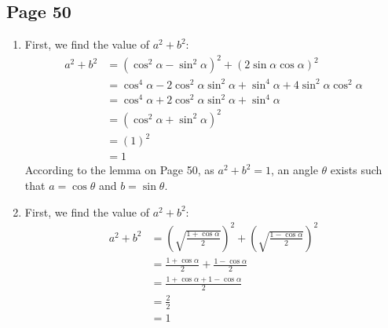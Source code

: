 \documentclass{article}
\newenvironment{solutions}[1]
{\subsection*{#1}
 \begin{enumerate}[leftmargin=1.5em]}
{\end{enumerate}}
\newcommand{\solution}{\item}
\begin{document}
\begin{solutions}{Page 50}

\solution %
First, we find the value of $a^2 + b^2$:
\begin{align*}
a^2 + b^2 &= (\cos^{2}{\alpha} - \sin^{2}{\alpha})^2 + (2\sin{\alpha}\cos{\alpha})^2 \\
&= \cos^{4}{\alpha} - 2\cos^{2}{\alpha}\sin^{2}{\alpha} + \sin^{4}{\alpha} + 4\sin^{2}{\alpha}\cos^{2}{\alpha} \\
&= \cos^{4}{\alpha} + 2\cos^{2}{\alpha}\sin^{2}{\alpha} + \sin^{4}{\alpha} \\
&= (\cos^{2}{\alpha} + \sin^{2}{\alpha})^2 \\
&= (1)^2 \\
&= 1
\end{align*}
According to the lemma on Page 50, as $a^2 + b^2 = 1$, an angle $\theta$ exists such that $a = \cos{\theta}$ and $b = \sin{\theta}$.

\solution %
First, we find the value of $a^2 + b^2$:
\begin{align*}
a^2 + b^2 &= \left(\sqrt{\frac{1 + \cos{\alpha}}{2}}\right)^2 + \left(\sqrt{\frac{1 - \cos{\alpha}}{2}}\right)^2 \\
&= \frac{1 + \cos{\alpha}}{2} + \frac{1 - \cos{\alpha}}{2} \\
&= \frac{1 + \cos{\alpha} + 1 - \cos{\alpha}}{2} \\
&= \frac{2}{2} \\
&= 1
\end{align*}


\end{solutions}
\end{document}
